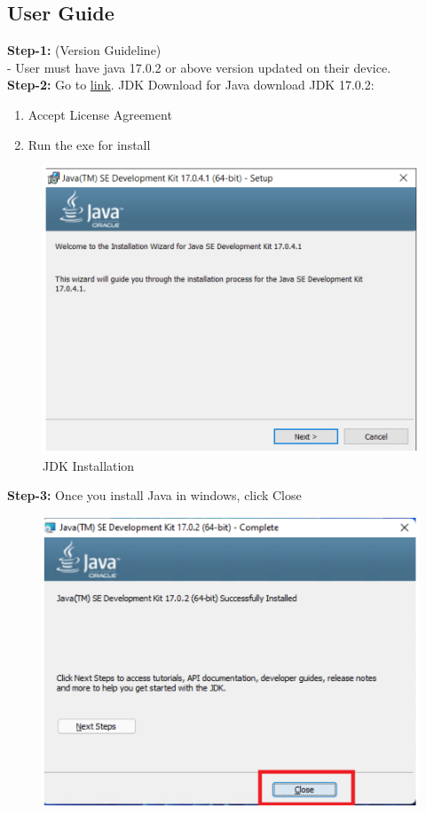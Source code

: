 \documentclass[12pt,letterpaper]{article}
\begin{document}
\begin{flushleft}
\section{User Guide}
\textbf{Step-1:} (Version Guideline)\\
- User must have java 17.0.2 or above version updated on their device.\\
\textbf{Step-2:}
Go to \href{https://download.oracle.com/java/17/archive/jdk-17.0.4.1_windows-x64_bin.msi}{link}. JDK Download for Java download JDK 17.0.2:\\
\begin{enumerate}
\item Accept License Agreement
\item Run the exe for install
\end{enumerate}
\begin{figure}[h]
    \centering
    \includegraphics[scale=0.8]{jdk.png}
    \caption{JDK Installation}
    \label{fig:myfigure}
\end{figure}
\textbf{Step-3:}
Once you install Java in windows, click Close
\begin{figure}[h]
    \centering
    \includegraphics[scale=0.8]{jdkinstall.png}

\end{figure}
\end{flushleft}
\end{document}
